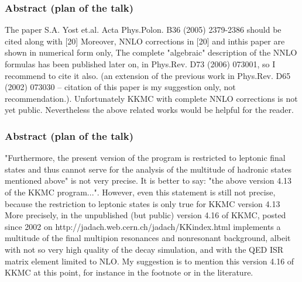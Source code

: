 \documentclass{beamer}
\begin{document}
\begin{frame}[fragile]
\frametitle{Abstract (plan of the talk)}
\small
The paper S.A. Yost et.al. Acta Phys.Polon. B36 (2005) 2379-2386 should be cited along with [20]
Moreover, NNLO corrections in [20] and inthis paper are shown in numerical form only,
The complete "algebraic" description of the NNLO formulas has been
published later on, in Phys.Rev. D73 (2006) 073001, so I recommend to cite it also.
(an extension of the previous work in Phys.Rev. D65 (2002) 073030 --
citation of this paper is my suggestion only, not recommendation.).
Unfortunately KKMC with complete NNLO corrections is not yet public.
Nevertheless the above related works would be helpful for the reader.
\end{frame}


\begin{frame}[fragile]
\frametitle{Abstract (plan of the talk)}
\small
"Furthermore, the present version of the program is restricted to leptonic final states
and thus cannot serve for the analysis of the multitude of hadronic states mentioned above"
is not very precise. It is better to say:
"the above version 4.13 of the KKMC program...".
However, even this statement is still not precise,
because the restriction to leptonic states is only true for KKMC version 4.13
More precisely, in the unpublished (but public) version 4.16 of KKMC, posted since 2002 on
http://jadach.web.cern.ch/jadach/KKindex.html
implements a multitude of the final multipion resonances and nonresonant background,
albeit with not so very high quality of the decay simulation,
and with the QED ISR matrix element limited to NLO.
My suggestion is to mention this version 4.16 of KKMC at this point,
for instance in the footnote or in the literature.
\end{frame}
\end{document}
